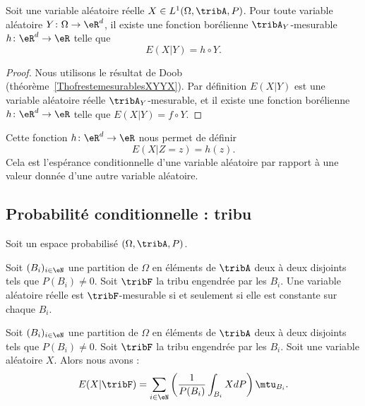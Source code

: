 \begin{proposition}
    Soit une variable aléatoire réelle \( X\in L^1(\Omega,\tribA,P)\). Pour toute variable aléatoire \( Y\colon \Omega\to \eR^d\), il existe une fonction borélienne \( \tribA_Y\)-mesurable \( h\colon \eR^d\to \eR\) telle que
    \begin{equation}
        E(X|Y)=h\circ Y.
    \end{equation}
\end{proposition}

\begin{proof}
    Nous utilisons le résultat de Doob (théorème~\ref{ThofrestemesurablesXYYX}). Par définition \( E(X|Y)\) est une variable aléatoire réelle \( \tribA_Y\)-mesurable, et il existe une fonction borélienne \( h\colon \eR^d\to \eR\) telle que \( E(X|Y)=f\circ Y\).
\end{proof}

Cette fonction \( h\colon \eR^d\to \eR\) nous permet de définir
\begin{equation}
    E(X|Z=z)=h(z).
\end{equation}
Cela est l'espérance conditionnelle d'une variable aléatoire par rapport à une valeur donnée d'une autre variable aléatoire.

\subsection{Probabilité conditionnelle : tribu}

Soit un espace probabilisé \( (\Omega,\tribA,P)\).

\begin{lemma}       \label{LEMooXXTYooZCXiYr}
    Soit \( (B_i)_{i\in\eN}\) une partition de \( \Omega\) en éléments de \( \tribA\) deux à deux disjoints tels que \( P(B_i)\neq 0\). Soit \( \tribF\) la tribu engendrée par les \( B_i\). Une variable aléatoire réelle est \( \tribF\)-mesurable si et seulement si elle est constante sur chaque \( B_i\).
\end{lemma}

\begin{proposition}
        Soit \( (B_i)_{i\in\eN}\) une partition de \( \Omega\) en éléments de \( \tribA\) deux à deux disjoints tels que \( P(B_i)\neq 0\). Soit \( \tribF\) la tribu engendrée par les \( B_i\). Soit une variable aléatoire \( X\). Alors nous avons :
    \begin{equation}    \label{EqCibwoG}
        E(X|\tribF)=\sum_{i\in \eN}\left( \frac{1}{ P(B_i) }\int_{B_i}XdP \right)\mtu_{B_i}.
    \end{equation}
\end{proposition}

